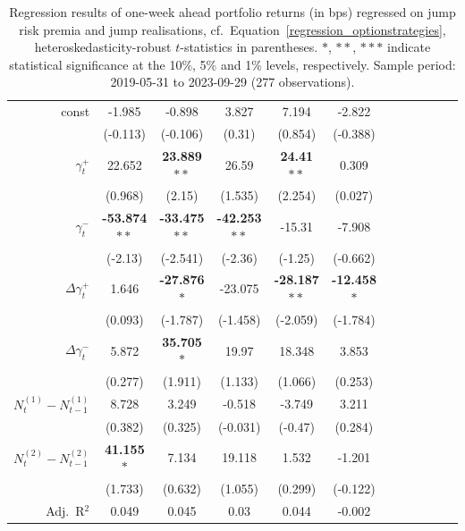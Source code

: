 \documentclass[11pt,a4paper]{article}
\numberwithin{equation}{section}
\theoremstyle{remark}
\theoremstyle{definition}
\begin{document}
\begin{table}[!tp]
    \caption{
        Regression results of one-week ahead portfolio returns (in bps) regressed on jump risk premia and jump realisations, cf.\ Equation~\eqref{regression_optionstrategies}, heteroskedasticity-robust $t$-statistics in parentheses. $*$, $**$, $***$ indicate statistical significance at the 10\%, 5\% and 1\% levels, respectively. Sample period: 2019-05-31 to 2023-09-29 (277 observations).
    }
    \begin{center}
      \begin{tabular}{rSSSSSSSSSSS}
  \toprule	& 	& 	& 	& 	& 	\\\midrule
const	& -1.985	& -0.898	& 3.827	& 7.194	& -2.822	\\
	& (-0.113)	& (-0.106)	& (0.31)	& (0.854)	& (-0.388)	\\
$\gamma^+_t$	& 22.652	& {\bf 23.889$**$}	& 26.59	& {\bf 24.41$**$}	& 0.309	\\
	& (0.968)	& (2.15)	& (1.535)	& (2.254)	& (0.027)	\\
$\gamma^-_t$	& {\bf -53.874$**$}	& {\bf -33.475$**$}	& {\bf -42.253$**$}	& -15.31	& -7.908	\\
	& (-2.13)	& (-2.541)	& (-2.36)	& (-1.25)	& (-0.662)	\\
$\Delta\gamma^+_t$	& 1.646	& {\bf -27.876$*$}	& -23.075	& {\bf -28.187$**$}	& {\bf -12.458$*$}\\
	& (0.093)	& (-1.787)	& (-1.458)	& (-2.059)	& (-1.784)	\\
$\Delta\gamma^-_t$	& 5.872	& {\bf 35.705$*$}	& 19.97	& 18.348	& 3.853	\\
	& (0.277)	& (1.911)	& (1.133)	& (1.066)	& (0.253)	\\
$N^{(1)}_t - N^{(1)}_{t-1}$	& 8.728	& 3.249	& -0.518	& -3.749	& 3.211	\\
	& (0.382)	& (0.325)	& (-0.031)	& (-0.47)	& (0.284)	\\
$N^{(2)}_t - N^{(2)}_{t-1}$	& {\bf 41.155$*$}	& 7.134	& 19.118	& 1.532	& -1.201	\\
	& (1.733)	& (0.632)	& (1.055)	& (0.299)	& (-0.122)	\\\midrule
Adj.\ R$^2$	& 0.049	& 0.045	& 0.03	& 0.044	& -0.002	\\\bottomrule
\end{tabular}
\bigskip


\end{center}
\end{table}
\end{document}
